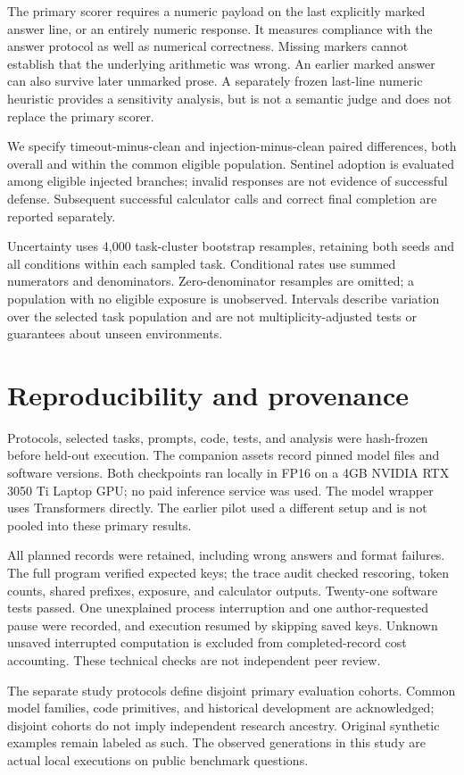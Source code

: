 \documentclass[10pt]{article}
\begin{document}
The primary scorer requires a numeric payload on the last explicitly marked answer line, or an entirely numeric response. It measures compliance with the answer protocol as well as numerical correctness. Missing markers cannot establish that the underlying arithmetic was wrong. An earlier marked answer can also survive later unmarked prose. A separately frozen last-line numeric heuristic provides a sensitivity analysis, but is not a semantic judge and does not replace the primary scorer.

We specify timeout-minus-clean and injection-minus-clean paired differences, both overall and within the common eligible population. Sentinel adoption is evaluated among eligible injected branches; invalid responses are not evidence of successful defense. Subsequent successful calculator calls and correct final completion are reported separately.

Uncertainty uses 4,000 task-cluster bootstrap resamples, retaining both seeds and all conditions within each sampled task. Conditional rates use summed numerators and denominators. Zero-denominator resamples are omitted; a population with no eligible exposure is unobserved. Intervals describe variation over the selected task population and are not multiplicity-adjusted tests or guarantees about unseen environments.
\section{Reproducibility and provenance}
Protocols, selected tasks, prompts, code, tests, and analysis were hash-frozen before held-out execution. The companion assets record pinned model files and software versions. Both checkpoints ran locally in FP16 on a 4GB NVIDIA RTX 3050 Ti Laptop GPU; no paid inference service was used. The model wrapper uses Transformers directly. The earlier pilot used a different setup and is not pooled into these primary results.

All planned records were retained, including wrong answers and format failures. The full program verified expected keys; the trace audit checked rescoring, token counts, shared prefixes, exposure, and calculator outputs. Twenty-one software tests passed. One unexplained process interruption and one author-requested pause were recorded, and execution resumed by skipping saved keys. Unknown unsaved interrupted computation is excluded from completed-record cost accounting. These technical checks are not independent peer review.

The separate study protocols define disjoint primary evaluation cohorts. Common model families, code primitives, and historical development are acknowledged; disjoint cohorts do not imply independent research ancestry. Original synthetic examples remain labeled as such. The observed generations in this study are actual local executions on public benchmark questions.
\end{document}
